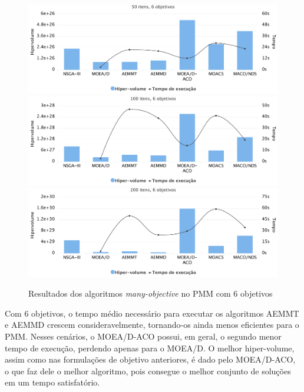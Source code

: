 \begin{figure}[!htbp]
	\includegraphics[width=1\textwidth]{cap_experimentos/figs/etapa4/i50o6}
	\includegraphics[width=1\textwidth]{cap_experimentos/figs/etapa4/i100o6}
	\includegraphics[width=1\textwidth]{cap_experimentos/figs/etapa4/i200o6}
	\caption{\label{fig_exp4_mkp_o6}Resultados dos algoritmos \textit{many-objective} no PMM com 6 objetivos}
\end{figure}

Com 6 objetivos, o tempo médio necessário para executar os algoritmos AEMMT e AEMMD crescem consideravelmente, tornando-os ainda menos eficientes para o PMM. Nesses cenários, o MOEA/D-ACO possui, em geral, o segundo menor tempo de execução, perdendo apenas para o MOEA/D. O melhor hiper-volume, assim como nas formulações de objetivo anteriores, é dado pelo MOEA/D-ACO, o que faz dele o melhor algoritmo, pois consegue o melhor conjunto de soluções em um tempo satisfatório.

